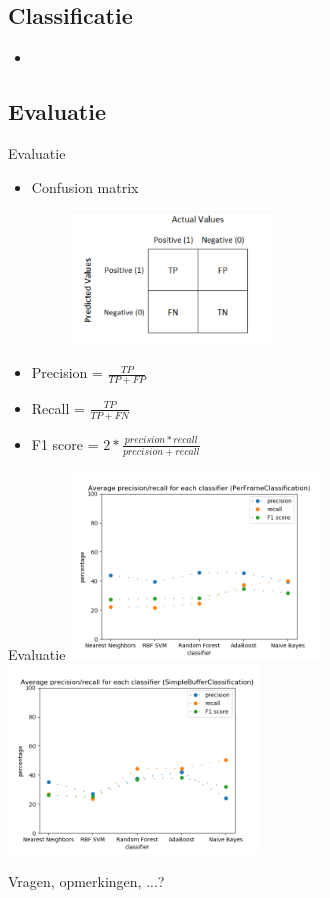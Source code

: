 \documentclass[]{beamer}
\begin{document}
	\subsection{Classificatie}
	\begin{frame}
		\begin{itemize}
			\item 
		\end{itemize}
	\end{frame}
	\subsection{Evaluatie}
	\begin{frame}{Evaluatie}
		\begin{itemize}
			\item Confusion matrix
			\begin{figure}[ht]
				\centering
				\includegraphics[width=0.5\textwidth]{confusionmatrix}
			\end{figure}
		
				\item Precision = $\frac{TP}{TP + FP}$
				\item Recall = $\frac{TP}{TP + FN}$
				\item F1 score = $2*\frac{precision * recall}{precision + recall}$
		
		\end{itemize}
	\end{frame}
	\begin{frame}{Evaluatie}
		\includegraphics[width=0.5\textwidth]{PerFrameClassification_PreProcessing}
		\includegraphics[width=0.5\textwidth]{SimpleBufferClassification_PreProcessing}
	\end{frame}
	
	
	\begin{frame}
		\begin{center}
			\Huge Vragen, opmerkingen, ...?
		\end{center}
	\end{frame}
\end{document}
